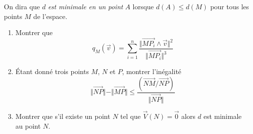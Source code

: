 On dira que $d$ \emph{est minimale en un point} $A$ lorsque $d(A)\leq d(M)$ pour tous les points $M$ de l'espace.
\begin{enumerate}
 \item Montrer que 
\begin{displaymath}
q_M(\overrightarrow v) =
 \sum _{i=1}^{n} \frac{\Vert\overrightarrow{MP_i}\wedge \overrightarrow v\Vert ^2}{\Vert \overrightarrow{MP_i} \Vert ^3} 
\end{displaymath}


 \item \'Etant donné trois points $M$, $N$ et $P$, montrer l'inégalité
\begin{displaymath}
 \Vert \overrightarrow{NP} \Vert - \Vert \overrightarrow{MP} \Vert \leq 
\frac{(\overrightarrow{NM}/\overrightarrow{NP})}{\Vert \overrightarrow{NP} \Vert}
\end{displaymath}
\item Montrer que s'il existe un point $N$ tel que $\overrightarrow{V}(N) = \overrightarrow 0$ alors $d$ est minimale au point $N$.


\end{enumerate}
